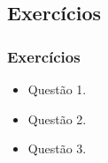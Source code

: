 \subsection[Exercícios]{Exercícios}\label{subsec:tema03-exercicios}



\begin{frame}[t]\frametitle{Exercícios}

\begin{itemize}
  \justifying{}
  \setlength\itemsep{1em}
  \item Questão 1.
  \item Questão 2.
  \item Questão 3.
\end{itemize}

\end{frame}
